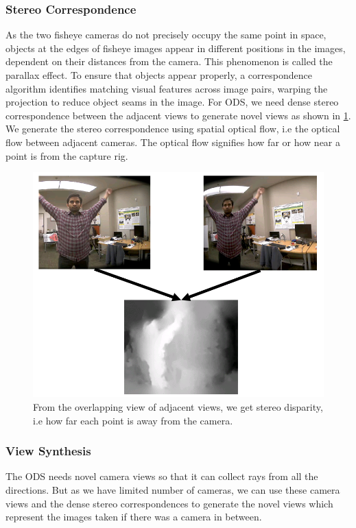 \subsubsection{Stereo Correspondence}  As the two fisheye cameras do not precisely occupy the same point in space, objects at the edges of fisheye images appear in different positions in the images, dependent on their distances from the camera. This phenomenon is called the parallax effect. To ensure that objects appear properly, a correspondence algorithm identifies matching visual features across image pairs, warping the projection to reduce object seams in the image. For ODS, we need dense stereo correspondence between the adjacent views to generate novel views as shown in \ref{fig:stereo_disparity}. We generate the stereo correspondence using spatial optical flow, i.e the optical flow between adjacent cameras. The optical flow signifies how far or how near a point is from the capture rig. 
\begin{figure}[h]
	\begin{center}
		\includegraphics[width=1\textwidth]{data/images/stereo_disparity.png}		
	\end{center}
	\caption{From the overlapping view of adjacent views, we get stereo disparity, i.e how far each point is away from the camera.}
	\label{fig:stereo_disparity}
\end{figure} 
\subsubsection{View Synthesis}
The ODS needs novel camera views so that it can collect rays from all the directions. But as we have limited number of cameras, we can use these camera views and the dense stereo correspondences to generate the novel views which represent the images taken if there was a camera in between. 
